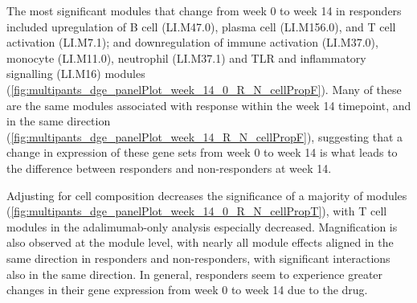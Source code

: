 The most significant modules that change from week 0 to week 14 in responders included
upregulation of B cell (LI.M47.0), plasma cell (LI.M156.0), and T cell activation (LI.M7.1);
and downregulation of immune activation (LI.M37.0), monocyte (LI.M11.0), neutrophil (LI.M37.1) and TLR and inflammatory signalling (LI.M16) modules (\cref{fig:multipants_dge_panelPlot_week_14_0_R_N_cellPropF}).
Many of these are the same modules associated with response within the week 14 timepoint, and in the same direction (\cref{fig:multipants_dge_panelPlot_week_14_R_N_cellPropF}),
suggesting that a change in expression of these gene sets from week 0 to week 14 is what leads to the difference between responders and non-responders at week 14.

Adjusting for cell composition decreases the significance of a majority of modules (\cref{fig:multipants_dge_panelPlot_week_14_0_R_N_cellPropT}),
with T cell modules in the adalimumab-only analysis especially decreased.
Magnification is also observed at the module level, with nearly all module effects aligned in the same direction in responders and non-responders, with significant interactions also in the same direction.
In general, responders seem to experience greater changes in their gene expression from week 0 to week 14 due to the drug.

